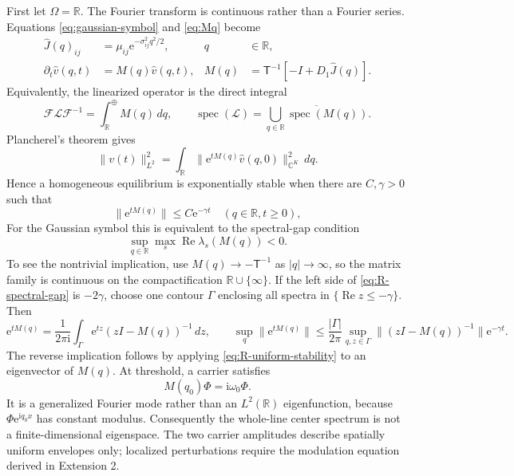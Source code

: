 \documentclass[11pt]{article}
\newcommand{\ii}{\mathrm{i}}
\newcommand{\ee}{\mathrm{e}}
\newcommand{\RePart}{\operatorname{Re}}
\newcommand{\T}{\mathsf T}
\begin{document}
First let $\Omega=\mathbb R$.  The Fourier transform is continuous rather
than a Fourier series.  Equations \eqref{eq:gaussian-symbol} and
\eqref{eq:Mq} become
\begin{align}
 \widehat J(q)_{ij}&=\mu_{ij}\ee^{-\sigma_{ij}^2q^2/2},
 &q&\in\mathbb R,\label{eq:R-symbol}\\
 \partial_t\widehat v(q,t)&=M(q)\widehat v(q,t),
 &M(q)&=\T^{-1}\left[-I+D_1\widehat J(q)\right].
 \label{eq:R-linearization}
\end{align}
Equivalently, the linearized operator is the direct integral
\begin{equation}
 \mathcal F\mathcal L\mathcal F^{-1}
 =\int_{\mathbb R}^{\oplus}M(q)\,dq,
 \qquad
 \operatorname{spec}(\mathcal L)
 =\overline{\bigcup_{q\in\mathbb R}\operatorname{spec}(M(q))}.
 \label{eq:R-direct-integral}
\end{equation}
Plancherel's theorem gives
\begin{equation}
 \|v(t)\|_{L^2}^2=
 \int_{\mathbb R}\|\ee^{tM(q)}\widehat v(q,0)\|_{\mathbb C^K}^2\,dq.
\end{equation}
Hence a homogeneous equilibrium is exponentially stable when there are
$C,\gamma>0$ such that
\begin{equation}
 \|\ee^{tM(q)}\|\leq C\ee^{-\gamma t}
 \quad(q\in\mathbb R,t\geq0),
 \label{eq:R-uniform-stability}
\end{equation}
For the Gaussian symbol this is equivalent to the spectral-gap condition
\begin{equation}
 \sup_{q\in\mathbb R}\max_s\RePart\lambda_s(M(q))<0.
 \label{eq:R-spectral-gap}
\end{equation}
To see the nontrivial implication, use
$M(q)\to-\T^{-1}$ as $|q|\to\infty$, so the matrix family is continuous on
the compactification $\mathbb R\cup\{\infty\}$.  If the left side of
\eqref{eq:R-spectral-gap} is $-2\gamma$, choose one contour $\Gamma$ enclosing
all spectra in $\{\RePart z\le-\gamma\}$.  Then
\begin{equation}
 \ee^{tM(q)}=\frac{1}{2\pi\ii}\int_\Gamma
 \ee^{tz}(zI-M(q))^{-1}\,dz,\qquad
 \sup_q\|\ee^{tM(q)}\|\le
 \frac{|\Gamma|}{2\pi}\sup_{q,z\in\Gamma}
 \|(zI-M(q))^{-1}\|\ee^{-\gamma t}.
 \label{eq:R-dunford-bound}
\end{equation}
The reverse implication follows by applying
\eqref{eq:R-uniform-stability} to an eigenvector of $M(q)$.
At threshold, a carrier satisfies
\begin{equation}
 M(q_0)\Phi=\ii\omega_0\Phi.
 \label{eq:R-carrier-eigenproblem}
\end{equation}
It is a generalized Fourier mode rather than an $L^2(\mathbb R)$
eigenfunction, because $\Phi\ee^{\ii q_0x}$ has constant modulus.
Consequently the whole-line center spectrum is not a finite-dimensional
eigenspace.  The two carrier amplitudes describe spatially uniform envelopes
only; localized perturbations require the modulation equation derived in
Extension 2.
\end{document}
